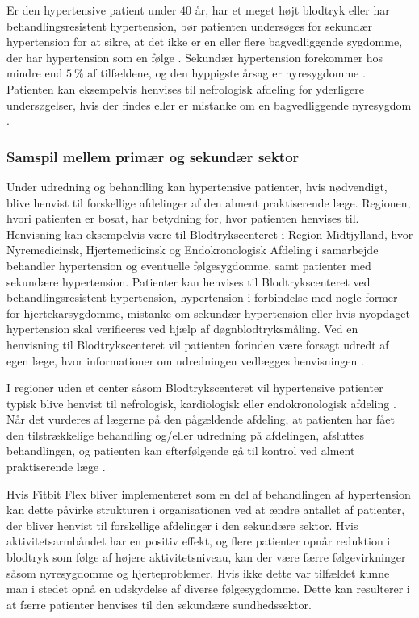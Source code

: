 Er den hypertensive patient under $40$ år, har et meget højt blodtryk eller har behandlingsresistent hypertension, bør patienten undersøges for sekundær hypertension for at sikre, at det ikke er en eller flere bagvedliggende sygdomme, der har hypertension som en følge \citep{lodberg2016}. Sekundær hypertension forekommer hos mindre end $5~\%$ af tilfældene, og den hyppigste årsag er nyresygdomme \citep{lodberg2008}. Patienten kan eksempelvis henvises til nefrologisk afdeling for yderligere undersøgelser, hvis der findes eller er mistanke om en bagvedliggende nyresygdom \citep{lodberg2016, sundhedsstyrelsen2010}. 

\subsubsection{Samspil mellem primær og sekundær sektor}
Under udredning og behandling kan hypertensive patienter, hvis nødvendigt, blive henvist til forskellige afdelinger af den alment praktiserende læge. Regionen, hvori patienten er bosat, har betydning for, hvor patienten henvises til. Henvisning kan eksempelvis være til Blodtrykscenteret i Region Midtjylland, hvor Nyremedicinsk, Hjertemedicinsk og Endokronologisk Afdeling i samarbejde behandler hypertension og eventuelle følgesygdomme, samt patienter med sekundære hypertension. Patienter kan henvises til Blodtrykscenteret ved behandlingsresistent hypertension, hypertension i forbindelse med nogle former for hjertekarsygdomme, mistanke om sekundær hypertension eller hvis nyopdaget hypertension skal verificeres ved hjælp af døgnblodtryksmåling. Ved en henvisning til Blodtrykscenteret vil patienten forinden være forsøgt udredt af egen læge, hvor informationer om udredningen vedlægges henvisningen \citep{aarhusuniversitetshospital}. 

I regioner uden et center såsom Blodtrykscenteret vil hypertensive patienter typisk blive henvist til nefrologisk, kardiologisk eller endokronologisk afdeling \citep{buur2011}. Når det vurderes af lægerne på den pågældende afdeling, at patienten har fået den tilstrækkelige behandling og/eller udredning på afdelingen, afsluttes behandlingen, og patienten kan efterfølgende gå til kontrol ved alment praktiserende læge \citep{sundhedsstyrelsen2010, lodberg2016}.

Hvis Fitbit Flex bliver implementeret som en del af behandlingen af hypertension kan dette påvirke strukturen i organisationen ved at ændre antallet af patienter, der bliver henvist til forskellige afdelinger i den sekundære sektor. Hvis aktivitetsarmbåndet har en positiv effekt, og flere patienter opnår reduktion i blodtryk som følge af højere aktivitetsniveau, kan der være færre følgevirkninger såsom nyresygdomme og hjerteproblemer. Hvis ikke dette var tilfældet kunne man i stedet opnå en udskydelse af diverse følgesygdomme. Dette kan resulterer i at færre patienter henvises til den sekundære sundhedssektor. 

